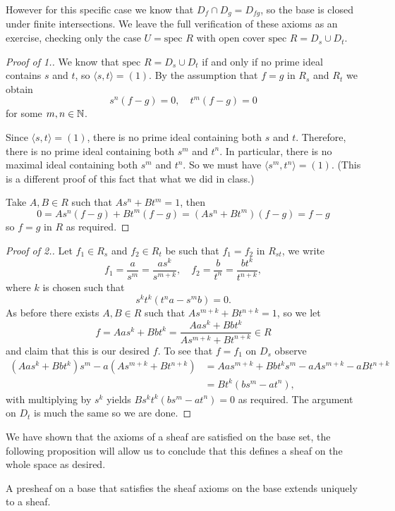 However for this specific case we know that $D_f\cap D_g = D_{fg}$, so the base is closed under finite intersections. We leave the full verification of these axioms as an exercise, checking only the case $U = \text{spec }\!R$ with open cover $\text{spec }\!R = D_s\cup D_t$.
\begin{proof}[Proof of 1.]
We know that $\text{spec }\!R = D_s\cup D_t$ if and only if no prime ideal contains $s$ and $t$, so $\langle s,t\rangle = (1)$. By the assumption that $f=g$ in $R_s$ and $R_t$ we obtain
\[
s^n (f-g) = 0,\quad t^m(f-g) = 0
\]
for some $m,n\in\mathbb{N}$.

Since \(\langle s,t \rangle = (1)\), there is no prime ideal containing both \(s\) and \(t\).
Therefore, there is no prime ideal containing both \(s^{m}\) and \(t^n\).
In particular, there is no maximal ideal containing both \(s^{m}\) and \(t^{n}\).
So we must have \(\langle s^{m}, t^n \rangle = (1)\).
(This is a different proof of this fact that what we did in class.)

Take $A,B\in R$ such that $As^n + Bt^m = 1$, then
\[
0 = As^n (f-g) + Bt^m(f-g)= (As^n + Bt^m )(f-g) = f-g
\]
so $f=g$ in $R$ as required.
\end{proof}
\begin{proof}[Proof of 2.]
Let $f_1\in R_s$ and $f_2\in R_t$ be such that $f_1=f_2$ in $R_{st}$, we write
\[
f_1 = \frac{a}{s^{m}} = \frac{as^k}{s^{m+k}},\quad f_2 = \frac{b}{t^{n}} = \frac{bt^k}{t^{n+k}},
\]
where $k$ is chosen such that
\[
s^kt^k(t^na-s^mb) = 0.
\]
As before there exists $A,B\in R$ such that $As^{m+k} + Bt^{n+k} = 1$, so we let
\[
f = Aas^k + Bbt^k = \frac{Aas^k + Bbt^k }{As^{m+k} + Bt^{n+k}} \in R
\]
and claim that this is our desired $f$. To see that $f=f_1$ on $D_s$ observe
\begin{align*}
(Aas^k + Bbt^k)s^m - a(As^{m+k} + Bt^{n+k}) &= Aas^{m+k} + Bbt^ks^m - aAs^{m+k} - aBt^{n+k}\\
&= Bt^k(bs^m - at^{n}),
\end{align*}
with multiplying by $s^k$ yields $Bs^kt^k(bs^m - at^{n})=0$ as required. The argument on $D_t$ is much the same so we are done.
\end{proof}
We have shown that the axioms of a sheaf are satisfied on the base set, the following proposition will allow us to conclude that this defines a sheaf on the whole space as desired.
\begin{proposition}\label{prop:sheaves-on-a-base}
A presheaf on a base that satisfies the sheaf axioms on the base extends uniquely to a sheaf.
\end{proposition}
